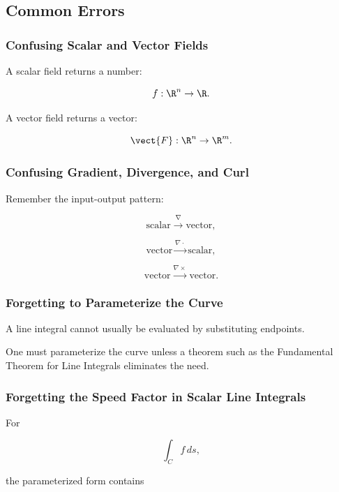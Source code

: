 \subsection{Common Errors}
\label{subsec:vector-calculus-common-errors}

\subsubsection{Confusing Scalar and Vector Fields}

A scalar field returns a number:

\[ f:\R^n\to\R. \]

A vector field returns a vector:

\[ \vect{F}:\R^n\to\R^m. \]

\subsubsection{Confusing Gradient, Divergence, and Curl}

Remember the input-output pattern:

\[ \text{scalar}\xrightarrow{\nabla}\text{vector}, \]

\[ \text{vector}\xrightarrow{\nabla\cdot}\text{scalar}, \]

\[ \text{vector}\xrightarrow{\nabla\times}\text{vector}. \]

\subsubsection{Forgetting to Parameterize the Curve}

A line integral cannot usually be evaluated by substituting endpoints.

One must parameterize the curve unless a theorem such as the Fundamental
Theorem for Line Integrals eliminates the need.

\subsubsection{Forgetting the Speed Factor in Scalar Line Integrals}

For

\[ \int_Cf\,ds, \]

the parameterized form contains

